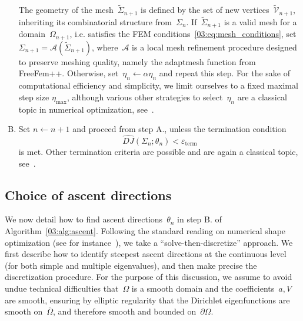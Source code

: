 \begin{algorithm}
\begin{enumerate}[A.]
{    The geometry of the mesh~$\widetilde{\Sigma}_{n+1}$ is defined by the set of new vertices~$\widetilde{\mathcal V}_{n+1}$, inheriting its combinatorial structure from~$\Sigma_n$.
    If~$\widetilde{\Sigma}_{n+1}$ is a valid mesh for a domain~$\Omega_{n+1}$, i.e. satisfies the FEM conditions~\eqref{03:eq:mesh_conditions}, set~$\Sigma_{n+1} = \mathcal A\left(\widetilde{\Sigma}_{n+1}\right)$, where~$\mathcal A$ is a local mesh refinement procedure designed to preserve meshing quality, namely the {\selectfont adaptmesh} function from FreeFem++.
    Otherwise, set~$\eta_n \leftarrow \alpha\eta_n$ and repeat this step. For the sake of computational efficiency and simplicity, we limit ourselves to a fixed maximal step size $\eta_{\max}$, although various other strategies to select~$\eta_n$ are a classical topic in numerical optimization, see~\cite[Chapter 3]{NW99}.
    }
    \item{Set $n\leftarrow n+1$ and proceed from step A., unless the termination condition
    $$\widehat{DJ}(\Sigma_n;\theta_n)< \varepsilon_{\mathrm{term}}$$
    is met. Other termination criteria are possible and are again a classical topic, see~\cite{NW99}.
    }
\end{enumerate}
\end{algorithm}

\subsection{Choice of ascent directions}
\label{03:subsec:ascent_direction}
We now detail how to find ascent directions~$\theta_n$ in step B. of Algorithm~\ref{03:alg:ascent}. Following the standard reading on numerical shape optimization (see for instance~\cite[Section 6.5]{AS07}), we take a ``solve-then-discretize'' approach. We first describe how to identify steepest ascent directions at the continuous level (for both simple and multiple eigenvalues), and then make precise the discretization procedure.
For the purpose of this discussion, we assume to avoid undue technical difficulties that~$\Omega$ is a smooth domain and the coefficients~$a,V$ are smooth, ensuring by elliptic regularity that the Dirichlet eigenfunctions are smooth on~$\overline{\Omega}$, and therefore smooth and bounded on~$\partial\Omega$.

